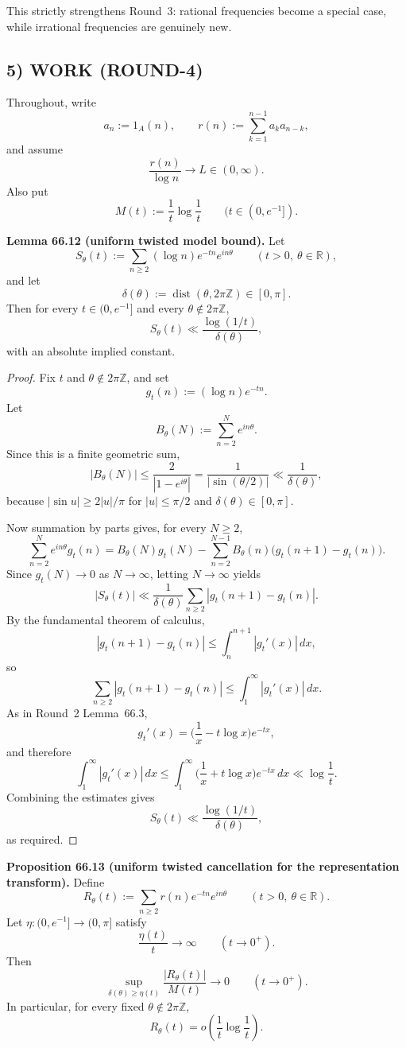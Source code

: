 This strictly strengthens Round~3: rational frequencies become a special case, while irrational frequencies are genuinely new.

\subsection*{5) WORK (ROUND-4)}
Throughout, write
\[
a_n:=1_A(n),\qquad r(n):=\sum_{k=1}^{n-1}a_ka_{n-k},
\]
and assume
\begin{equation}
\label{eq:R4-assumption}
\frac{r(n)}{\log n}\to L\in(0,\infty).
\end{equation}
Also put
\[
M(t):=\frac1t\log\frac1t\qquad(t\in(0,e^{-1}]).
\]

\medskip
\noindent\textbf{Lemma 66.12 (uniform twisted model bound).}
Let
\[
S_\theta(t):=\sum_{n\ge2}(\log n)e^{-tn}e^{in\theta}
\qquad(t>0,\ \theta\in\mathbb R),
\]
and let
\[
\delta(\theta):=\operatorname{dist}(\theta,2\pi\mathbb Z)\in[0,\pi].
\]
Then for every $t\in(0,e^{-1}]$ and every $\theta\notin 2\pi\mathbb Z$,
\[
S_\theta(t)\ll \frac{\log(1/t)}{\delta(\theta)},
\]
with an absolute implied constant.

\begin{proof}
Fix $t$ and $\theta\notin 2\pi\mathbb Z$, and set
\[
g_t(n):=(\log n)e^{-tn}.
\]
Let
\[
B_\theta(N):=\sum_{n=2}^{N} e^{in\theta}.
\]
Since this is a finite geometric sum,
\[
|B_\theta(N)|\le \frac{2}{|1-e^{i\theta}|}
=\frac{1}{|\sin(\theta/2)|}
\ll \frac{1}{\delta(\theta)},
\]
because $|\sin u|\ge 2|u|/\pi$ for $|u|\le \pi/2$ and $\delta(\theta)\in[0,\pi]$.

Now summation by parts gives, for every $N\ge2$,
\[
\sum_{n=2}^{N} e^{in\theta}g_t(n)
=B_\theta(N)g_t(N)-\sum_{n=2}^{N-1} B_\theta(n)\big(g_t(n+1)-g_t(n)\big).
\]
Since $g_t(N)\to0$ as $N\to\infty$, letting $N\to\infty$ yields
\[
|S_\theta(t)|
\ll \frac{1}{\delta(\theta)}\sum_{n\ge2}|g_t(n+1)-g_t(n)|.
\]
By the fundamental theorem of calculus,
\[
|g_t(n+1)-g_t(n)|\le \int_n^{n+1}|g_t'(x)|\,dx,
\]
so
\[
\sum_{n\ge2}|g_t(n+1)-g_t(n)|\le \int_1^{\infty}|g_t'(x)|\,dx.
\]
As in Round~2 Lemma~66.3,
\[
g_t'(x)=\Big(\frac1x-t\log x\Big)e^{-tx},
\]
and therefore
\[
\int_1^{\infty}|g_t'(x)|\,dx
\le \int_1^{\infty}\Big(\frac1x+t\log x\Big)e^{-tx}\,dx
\ll \log\frac1t.
\]
Combining the estimates gives
\[
S_\theta(t)\ll \frac{\log(1/t)}{\delta(\theta)},
\]
as required.
\end{proof}

\medskip
\noindent\textbf{Proposition 66.13 (uniform twisted cancellation for the representation transform).}
Define
\[
R_\theta(t):=\sum_{n\ge2} r(n)e^{-tn}e^{in\theta}
\qquad(t>0,\ \theta\in\mathbb R).
\]
Let $\eta:(0,e^{-1}]\to(0,\pi]$ satisfy
\[
\frac{\eta(t)}{t}\to\infty\qquad(t\to0^+).
\]
Then
\[
\sup_{\delta(\theta)\ge \eta(t)} \frac{|R_\theta(t)|}{M(t)}\to 0
\qquad(t\to0^+).
\]
In particular, for every fixed $\theta\notin2\pi\mathbb Z$,
\[
R_\theta(t)=o\!\left(\frac1t\log\frac1t\right).
\]


